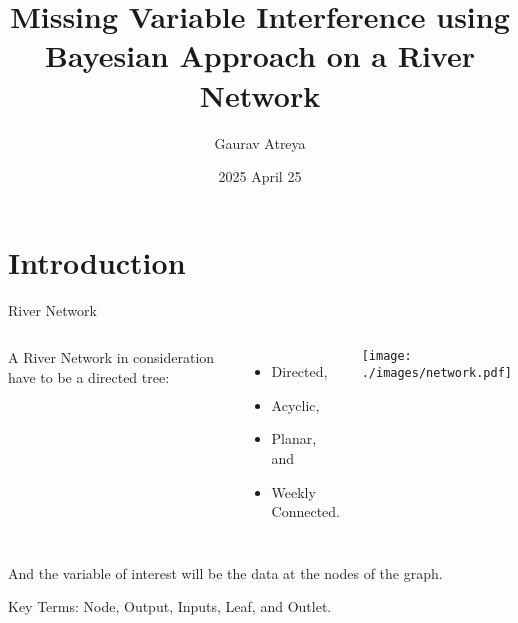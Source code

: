 \documentclass{beamer}
\title{Missing Variable Interference using Bayesian Approach on a River Network}
\author{Gaurav Atreya}
\institute{
 University of Cincinnati}
\date{2025 April 25}
\begin{document}
\begin{frame}
  \titlepage
\end{frame}

\section{Introduction}

\begin{frame}{River Network}
  \begin{columns}
    A River Network in consideration have to be a directed tree:
    \begin{itemize}
    \item Directed,
    \item Acyclic,
    \item Planar, and
    \item Weekly Connected.
    \end{itemize}

    \texttt{[image: ./images/network.pdf]}

  \end{columns}

  \vspace{0.5cm}
    
    And the variable of interest will be the data at the nodes of the graph.

    \vfill
    \pause
    
    {\color{blue}Key Terms}: Node, Output, Inputs, Leaf, and Outlet.
    
\end{frame}
\end{document}

